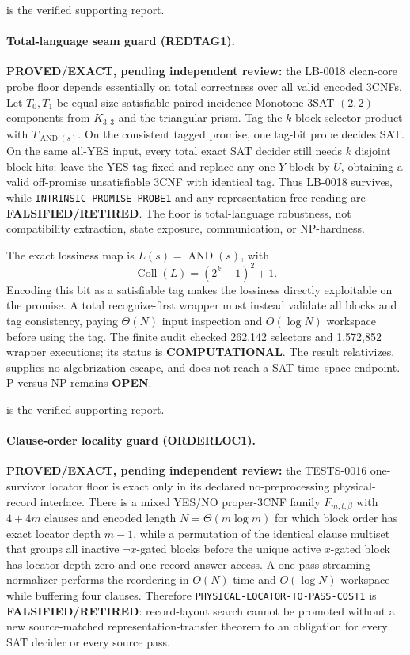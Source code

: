 \documentclass[11pt]{article}
\begin{document}
 is the verified supporting report.

\paragraph{Total-language seam guard (REDTAG1).}
\textbf{PROVED/EXACT, pending independent review:} the LB-0018 clean-core probe floor depends essentially on total correctness over all valid encoded \(3\)CNFs.  Let \(T_0,T_1\) be equal-size satisfiable paired-incidence Monotone \(3\)SAT-\((2,2)\) components from \(K_{3,3}\) and the triangular prism.  Tag the \(k\)-block selector product with \(T_{\operatorname{AND}(s)}\).  On the consistent tagged promise, one tag-bit probe decides SAT.  On the same all-YES input, every total exact SAT decider still needs \(k\) disjoint block hits: leave the YES tag fixed and replace any one \(Y\) block by \(U\), obtaining a valid off-promise unsatisfiable \(3\)CNF with identical tag.  Thus LB-0018 survives, while \texttt{INTRINSIC-PROMISE-PROBE1} and any representation-free reading are \textbf{FALSIFIED/RETIRED}.  The floor is total-language robustness, not compatibility extraction, state exposure, communication, or NP-hardness.

The exact lossiness map is \(L(s)=\operatorname{AND}(s)\), with
\[
 \operatorname{Coll}(L)=(2^k-1)^2+1.
\]
Encoding this bit as a satisfiable tag makes the lossiness directly exploitable on the promise.  A total recognize-first wrapper must instead validate all blocks and tag consistency, paying \(\Theta(N)\) input inspection and \(O(\log N)\) workspace before using the tag.  The finite audit checked 262,142 selectors and 1,572,852 wrapper executions; its status is \textbf{COMPUTATIONAL}.  The result relativizes, supplies no algebrization escape, and does not reach a SAT time--space endpoint.  P versus NP remains \textbf{OPEN}.

 is the verified supporting report.

\paragraph{Clause-order locality guard (ORDERLOC1).}
\textbf{PROVED/EXACT, pending independent review:} the TESTS-0016 one-survivor locator floor is exact only in its declared no-preprocessing physical-record interface.  There is a mixed YES/NO proper-$3$CNF family $F_{m,t,\beta}$ with $4+4m$ clauses and encoded length $N=\Theta(m\log m)$ for which block order has exact locator depth $m-1$, while a permutation of the identical clause multiset that groups all inactive $\neg x$-gated blocks before the unique active $x$-gated block has locator depth zero and one-record answer access.  A one-pass streaming normalizer performs the reordering in $O(N)$ time and $O(\log N)$ workspace while buffering four clauses.  Therefore \texttt{PHYSICAL-LOCATOR-TO-PASS-COST1} is \textbf{FALSIFIED/RETIRED}: record-layout search cannot be promoted without a new source-matched representation-transfer theorem to an obligation for every SAT decider or every source pass.
\end{document}
